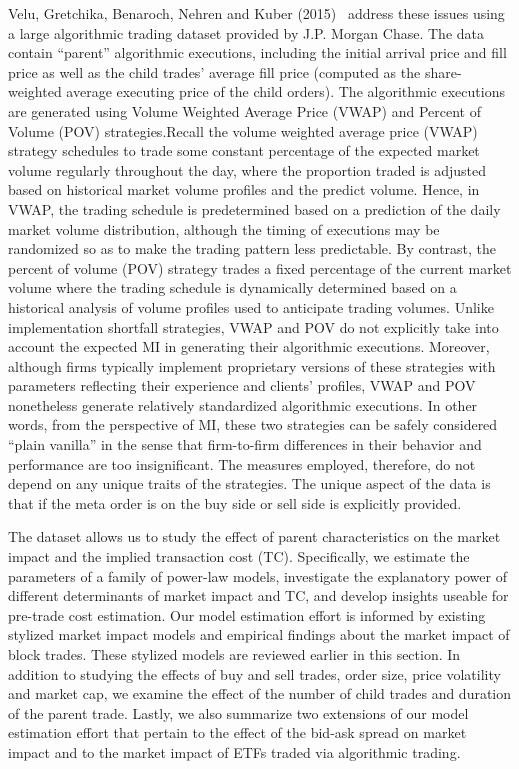 Velu, Gretchika, Benaroch, Nehren and Kuber (2015)~\cite{unpub} address these issues using a large algorithmic trading dataset provided by J.P. Morgan Chase. The data contain ``parent'' algorithmic executions, including the initial arrival price and fill price as well as the child trades' average fill price (computed as the share-weighted average executing price of the child orders). The algorithmic executions are generated using Volume Weighted Average Price (VWAP) and Percent of Volume (POV) strategies.Recall the volume weighted average price (VWAP) strategy schedules to trade some constant percentage of the expected market volume regularly throughout the day, where the proportion traded is adjusted based on historical market volume profiles and the predict volume. Hence, in VWAP, the trading schedule is predetermined based on a prediction of the daily market volume distribution, although the timing of executions may be randomized so as to make the trading pattern less predictable. By contrast, the percent of volume (POV) strategy trades a fixed percentage of the current market volume where the trading schedule is dynamically determined based on a historical analysis of volume profiles used to anticipate trading volumes. Unlike implementation shortfall strategies, VWAP and POV do not explicitly take into account the expected MI in generating their algorithmic executions. Moreover, although firms typically implement proprietary versions of these strategies with parameters reflecting their experience and clients' profiles, VWAP and POV nonetheless generate relatively standardized algorithmic executions. In other words, from the perspective of MI, these two strategies can be safely considered ``plain vanilla'' in the sense that firm-to-firm differences in their behavior and performance are too insignificant. The measures employed, therefore, do not depend on any unique traits of the strategies. The unique aspect of the data is that if the meta order is on the buy side or sell side is explicitly provided. 


The dataset allows us to study the effect of parent characteristics on the market impact and the implied transaction cost (TC). Specifically, we estimate the parameters of a family of power-law models, investigate the explanatory power of different determinants of market impact and TC, and develop insights useable for pre-trade cost estimation. Our model estimation effort is informed by existing stylized market impact models and empirical findings about the market impact of block trades. These stylized models are reviewed earlier in this section. In addition to studying the effects of buy and sell trades, order size, price volatility and market cap, we examine the effect of the number of child trades and duration of the parent trade. Lastly, we also summarize two extensions of our model estimation effort that pertain to the effect of the bid-ask spread on market impact and to the market impact of ETFs traded via algorithmic trading.


